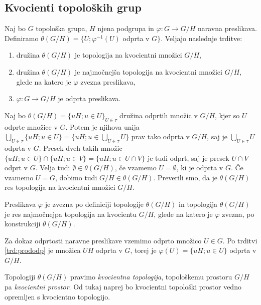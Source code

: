 \documentclass[mat1]{fmfdelo}
\begin{document}
\subsection{Kvocienti topoloških grup}

\begin{izrek}\label{izr:topkvocienta}
Naj bo $G$ topološka grupa, $H$ njena podgrupa in $\varphi\colon G \to G/H$ naravna preslikava. Definiramo $\theta(G/H) = \lbrace U ; \varphi^{-1}(U)$ odprta v $G \rbrace$.
Veljajo naslednje trditve:
\begin{enumerate}
\item družina $\theta(G/H)$ je topologija na kvocientni množici $G/H$,
\item družina $\theta(G/H)$ je najmočnejša topologija na kvocientni množici $G/H$, glede na katero je $\varphi$ zvezna preslikava,
\item $\varphi: G \to G/H$ je odprta preslikava.
\end{enumerate}
\end{izrek}

\begin{dokaz}
Naj bo $\theta(G/H) = \lbrace uH ; u \in U \rbrace_{U \in \tau}$ družina odprtih množic v $G/H$, kjer so $U$ odprte množice v $G$. Potem je njihova unija $\bigcup_{U \in \tau} \lbrace uH ; u \in U \rbrace = \lbrace uH ; u \in \bigcup_{U \in \tau}U \rbrace$ prav tako odprta v $G/H$, saj je $\bigcup_{U \in \tau}U$ odprta v $G$. Presek dveh takih množic $\lbrace uH ; u \in U \rbrace \cap \lbrace uH ; u \in V \rbrace = \lbrace uH ; u \in U \cap V \rbrace$ je tudi odprt, saj je presek $U \cap V$ odprt v $G$. Velja tudi $\emptyset \in \theta(G/H)$, če vzamemo $U = \emptyset$, ki je odprta v $G$. Če vzamemo $U = G$, dobimo tudi $G/H \in \theta(G/H)$. Preverili smo, da je $\theta(G/H)$ res topologija na kvocientni množici $G/H$.

Preslikava $\varphi$ je zvezna po definiciji topologije $\theta(G/H)$ in topologija $\theta(G/H)$ je res najmočnejpa topologija na kvocientu $G/H$, glede na katero je $\varphi$ zvezna, po konstrukciji $\theta(G/H)$.

Za dokaz odprtosti naravne preslikave vzemimo odprto množico $U \in G$. Po trditvi \ref{trd:prododp} je množica $UH$ odprta v $G$, torej je $\varphi(U) = \lbrace uH ; u \in U \rbrace$ odprta v $G/H$.
\end{dokaz}

Topologiji $\theta(G/H)$ pravimo \emph{kvocientna topologija}, topološkemu prostoru $G/H$ pa \emph{kvocientni prostor}. Od tukaj naprej bo kvocientni topološki prostor vedno opremljen s kvocientno topologijo.
\end{document}
